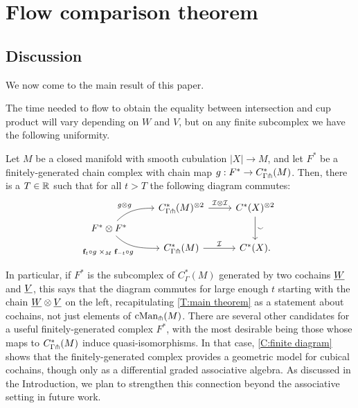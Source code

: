
\section{Flow comparison theorem}\label{S:flow comparison theorem}

\subsection{Discussion}

We now come to the main result of this paper.

\maintheorem*

The time needed to flow to obtain the equality between intersection and cup product will vary depending on $W$ and $V$, but on any finite subcomplex we have the following uniformity.

\begin{corollary}\label{C:finite diagram}
	Let $M$ be a closed manifold with smooth cubulation $|X|\to M$, and let $F^*$ be a finitely-generated chain complex with chain map $g:F^*\to C^*_{\Gamma \pitchfork}(M)$.
	Then, there is a $T \in \mathbb{R}$ such that for all $t > T$ the following diagram commutes:
	\begin{equation*}
		\begin{tikzcd} [row sep=tiny]
			& C^*_{\Gamma \pf}(M)^{\otimes 2} \arrow[r, "\cI \otimes \cI"] & \cochains(X)^{\otimes 2} \arrow[dd, "\sms"] \\
			F^*\otimes F^* \arrow[ur, in=180, out=45,"g\otimes g"] \arrow[dr, in=180, out=-45, "\f_t \circ g \; \times_M \; \f_{-t} \circ g"']& & \\
			& C^*_{\Gamma \pf}(M) \arrow[r, "\cI"] & \cochains(X).
		\end{tikzcd}
	\end{equation*}
\end{corollary}

In particular, if $F^*$ is the subcomplex of $C^*_\Gamma(M)$ generated by two cochains $\underline{W}$ and $\underline{V}$, this says that the diagram commutes for large enough $t$ starting with the chain $\underline{W}\otimes\underline{V}$ on the left, recapitulating \cref{T:main theorem} as a statement about cochains, not just elements of $\mathrm{cMan}_\pitchfork(M)$.
There are several other candidates for a useful finitely-generated complex $F^*$, with the most desirable being those whose maps to $C^*_{\Gamma \pitchfork}(M)$ induce quasi-isomorphisms.
In that case, \cref{C:finite diagram} shows that the finitely-generated complex provides a geometric model for cubical cochains, though only as a differential graded associative algebra.
As discussed in the Introduction, we plan to strengthen this connection beyond the associative setting in future work.

